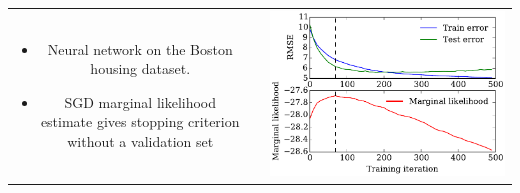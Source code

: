 \documentclass[portrait,a0b,final,a4resizeable]{include/a0poster}
\begin{document}
\begin{poster}
\begin{multicols}{2}
\vspace{0.5in}

\begin{tabular}{ccc}
\begin{minipage}[c]{0.35\columnwidth}
\begin{itemize} 
\item Neural network on the Boston housing dataset.
\item SGD marginal likelihood estimate gives stopping criterion without a validation set
\end{itemize}
\end{minipage} & \quad &
\begin{minipage}[c]{0.55\columnwidth}
\includegraphics[width=\columnwidth]{../experiments/2015_03_01_housing/2/marglik.pdf}
\end{minipage}
\end{tabular}

\vspace{0.5in}


\end{multicols}
\end{poster}
\end{document}
